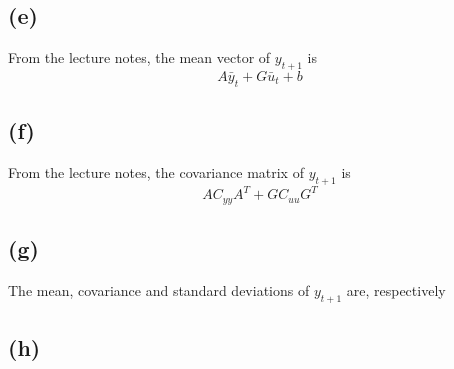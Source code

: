 \documentclass[fleqn, letterpaper]{tufte-handout}
\begin{document}
\subsection{(e)}
From the lecture notes, the mean vector of $y_{t+1}$ is
\[A\bar y_t + G\bar u_t + b
\]
\subsection{(f)}
From the lecture notes, the covariance matrix of $y_{t+1}$ is
\[AC_{yy}A^T + GC_{uu}G^T
\]
\subsection{(g)}
The mean, covariance and standard deviations of $y_{t+1}$ are, respectively
\subsection{(h)}
\end{document}

